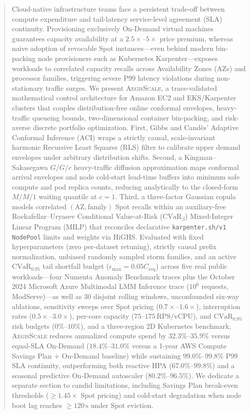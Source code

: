 \documentclass[journal]{IEEEtran}
\begin{document}
\begin{abstract}
Cloud-native infrastructure teams face a persistent trade-off between compute expenditure and tail-latency service-level agreement (SLA) continuity. Provisioning exclusively On-Demand virtual machines guarantees capacity availability at a $2.5\times$--$5\times$ price premium, whereas naive adoption of revocable Spot instances---even behind modern bin-packing node provisioners such as Kubernetes Karpenter---exposes workloads to correlated capacity recalls across Availability Zones (AZs) and processor families, triggering severe $\mathrm{P99}$ latency violations during non-stationary traffic surges. We present \textsc{AegisScale}, a trace-validated mathematical control architecture for Amazon EC2 and EKS/Karpenter clusters that couples distribution-free online conformal envelopes, heavy-traffic queueing bounds, two-dimensional container bin-packing, and risk-averse discrete portfolio optimization. First, Gibbs and Cand\`es' Adaptive Conformal Inference (ACI) wraps a strictly causal, scale-invariant harmonic Recursive Least Squares (RLS) filter to calibrate upper demand envelopes under arbitrary distribution shifts. Second, a Kingman--Sakasegawa $G/G/c$ heavy-traffic diffusion approximation maps conformal arrival envelopes and node cold-start lead-time buffers into minimum safe compute and pod replica counts, reducing analytically to the closed-form $M/M/1$ waiting quantile at $c=1$. Third, a three-factor Gaussian copula models correlated $(\text{AZ}, \text{family})$ Spot recalls within an auxiliary-free Rockafellar--Uryasev Conditional Value-at-Risk ($\mathrm{CVaR}_\beta$) Mixed-Integer Linear Program (MILP) that reconciles declarative \texttt{karpenter.sh/v1} \texttt{NodePool} limits and weights via HiGHS. Evaluated with fixed hyperparameters (zero per-dataset retuning), strictly causal prefix normalization, unbiased randomly sampled storm families, and an active $\mathrm{CVaR}_{0.95}$ tail shortfall budget ($\epsilon_{\max} = 0.05 C_{\mathrm{req}}$) across five real public workloads---four Numenta Anomaly Benchmark traces plus the October 2024 Microsoft Azure Multimodal LMM Inference trace ($10^6$ requests, ModServe)---as well as $30$ disjoint rolling windows, unconfounded six-way ablations, sensitivity sweeps over Spot pricing ($0.7\times$--$1.6\times$), interruption rates ($0.5\times$--$3.0\times$), per-core capacity ($75$--$175\,\text{RPS/vCPU}$), and $\mathrm{CVaR}_{0.95}$ risk budgets ($0\%$--$10\%$), and a three-region 2D Kubernetes benchmark, \textsc{AegisScale} reduces annualized compute spend by $32.3\%$--$35.9\%$ versus equal-SLA On-Demand ($18.4\%$--$31.0\%$ versus a 1-year AWS Compute Savings Plan + On-Demand baseline) while sustaining $99.0\%$--$99.8\%$ $\mathrm{P99}$ SLA continuity, outperforming both reactive HPA ($67.0\%$--$99.8\%$) and a seasonal predictive On-Demand autoscaler ($80.2\%$--$96.5\%$). We dedicate a separate section to candid limitations, including Savings Plan break-even thresholds ($\ge 1.45\times$ Spot pricing) and cold-start degradation when node boot lag reaches $\ge 120\,\mathrm{s}$ under Spot eviction.
\end{abstract}
\end{document}
